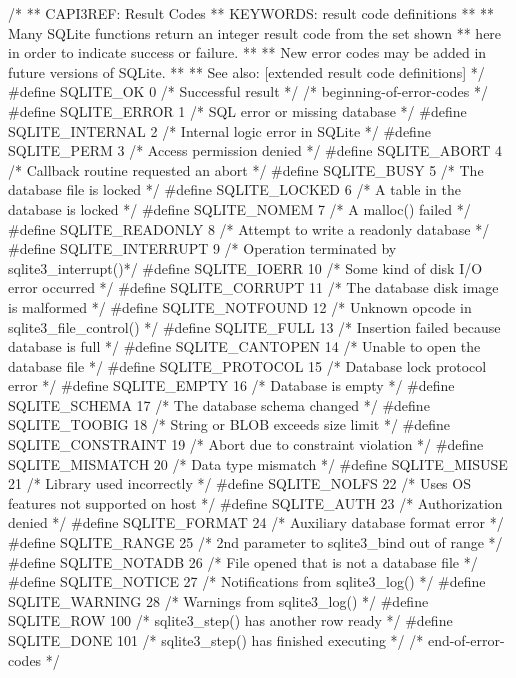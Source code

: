 \begin{Codex}[label=sqlite3.h,numbers=left]
{/*
** CAPI3REF: Result Codes
** KEYWORDS: {result code definitions}
**
** Many SQLite functions return an integer result code from the set shown
** here in order to indicate success or failure.
**
** New error codes may be added in future versions of SQLite.
**
** See also: [extended result code definitions]
*/
#define SQLITE_OK           0   /* Successful result */
/* beginning-of-error-codes */
#define SQLITE_ERROR        1   /* SQL error or missing database */
#define SQLITE_INTERNAL     2   /* Internal logic error in SQLite */
#define SQLITE_PERM         3   /* Access permission denied */
#define SQLITE_ABORT        4   /* Callback routine requested an abort */
#define SQLITE_BUSY         5   /* The database file is locked */
#define SQLITE_LOCKED       6   /* A table in the database is locked */
#define SQLITE_NOMEM        7   /* A malloc() failed */
#define SQLITE_READONLY     8   /* Attempt to write a readonly database */
#define SQLITE_INTERRUPT    9   /* Operation terminated by sqlite3_interrupt()*/
#define SQLITE_IOERR       10   /* Some kind of disk I/O error occurred */
#define SQLITE_CORRUPT     11   /* The database disk image is malformed */
#define SQLITE_NOTFOUND    12   /* Unknown opcode in sqlite3_file_control() */
#define SQLITE_FULL        13   /* Insertion failed because database is full */
#define SQLITE_CANTOPEN    14   /* Unable to open the database file */
#define SQLITE_PROTOCOL    15   /* Database lock protocol error */
#define SQLITE_EMPTY       16   /* Database is empty */
#define SQLITE_SCHEMA      17   /* The database schema changed */
#define SQLITE_TOOBIG      18   /* String or BLOB exceeds size limit */
#define SQLITE_CONSTRAINT  19   /* Abort due to constraint violation */
#define SQLITE_MISMATCH    20   /* Data type mismatch */
#define SQLITE_MISUSE      21   /* Library used incorrectly */
#define SQLITE_NOLFS       22   /* Uses OS features not supported on host */
#define SQLITE_AUTH        23   /* Authorization denied */
#define SQLITE_FORMAT      24   /* Auxiliary database format error */
#define SQLITE_RANGE       25   /* 2nd parameter to sqlite3_bind out of range */
#define SQLITE_NOTADB      26   /* File opened that is not a database file */
#define SQLITE_NOTICE      27   /* Notifications from sqlite3_log() */
#define SQLITE_WARNING     28   /* Warnings from sqlite3_log() */
#define SQLITE_ROW         100  /* sqlite3_step() has another row ready */
#define SQLITE_DONE        101  /* sqlite3_step() has finished executing */
/* end-of-error-codes */

}
\end{Codex}
